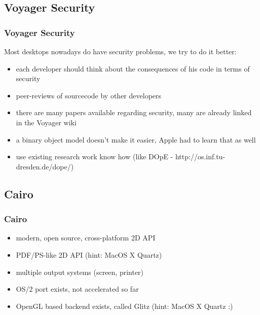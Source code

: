 \documentclass[handout]{beamer}
\begin{document}
\subsection{Voyager Security}
\begin{frame}
\frametitle{Voyager Security}
	Most desktops nowadays do have security problems, we try to do it better:
	\begin{itemize}
      \item each developer should think about the consequences of his code in terms of security
      \item peer-reviews of sourcecode by other developers
      \item there are many papers available regarding security, many are already linked in the Voyager wiki
      \item a binary object model doesn't make it easier, Apple had to learn that as well
      \item use existing research work know how (like DOpE - http://os.inf.tu-dresden.de/dope/)
	\end{itemize}
\end{frame}


\subsection{Cairo}
\begin{frame}
\frametitle{Cairo}
	\begin{itemize}
		\item modern, open source, cross-platform 2D API
		\item PDF/PS-like 2D API (hint: MacOS X Quartz)
		\item multiple output systems (screen, printer)
		\item OS/2 port exists, not accelerated so far
		\item OpenGL based backend exists, called Glitz (hint: MacOS X Quartz :)
	\end{itemize}
\end{frame}
\end{document}
